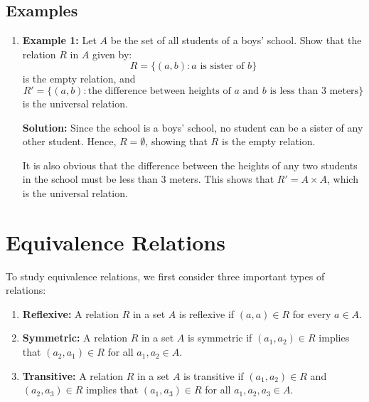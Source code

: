 \documentclass[12pt]{article}
\newcommand{\solution}{\noindent \textbf{Solution: }}
\begin{document}
\subsection{Examples}
\begin{enumerate}
    \item \textbf{Example 1:} Let \( A \) be the set of all students of a boys' school. Show that the relation \( R \) in \( A \) given by:
    \[
    R = \{(a, b) : a \text{ is sister of } b\}
    \]
    is the empty relation, and
    \[
    R' = \{(a, b) : \text{the difference between heights of } a \text{ and } b \text{ is less than 3 meters}\}
    \]
    is the universal relation.
    
    \solution Since the school is a boys' school, no student can be a sister of any other student. Hence, \( R = \emptyset \), showing that \( R \) is the empty relation. 
    
    It is also obvious that the difference between the heights of any two students in the school must be less than 3 meters. This shows that \( R' = A \times A \), which is the universal relation.
\end{enumerate}

\section{Equivalence Relations}
To study equivalence relations, we first consider three important types of relations:

\begin{enumerate}
    \item \textbf{Reflexive:} A relation \( R \) in a set \( A \) is reflexive if \( (a, a) \in R \) for every \( a \in A \).
    \item \textbf{Symmetric:} A relation \( R \) in a set \( A \) is symmetric if \( (a_1, a_2) \in R \) implies that \( (a_2, a_1) \in R \) for all \( a_1, a_2 \in A \).
    \item \textbf{Transitive:} A relation \( R \) in a set \( A \) is transitive if \( (a_1, a_2) \in R \) and \( (a_2, a_3) \in R \) implies that \( (a_1, a_3) \in R \) for all \( a_1, a_2, a_3 \in A \).
\end{enumerate}
\end{document}
